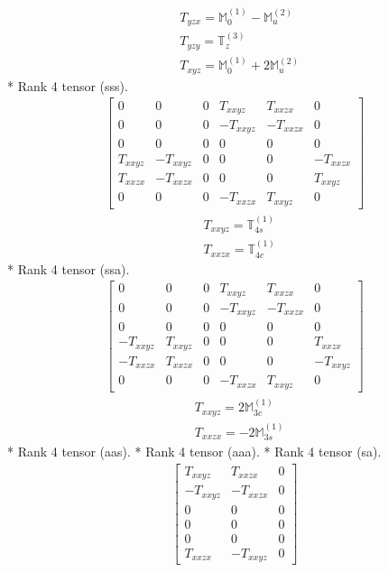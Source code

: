 \documentclass[fleqn,8pt,landscape]{jsarticle}
\begin{document}
\begin{align*}
& T_{yzx} = \mathbb{M}_{0}^{(1)} - \mathbb{M}_{u}^{(2)} \\
& T_{yzy} = \mathbb{T}_{z}^{(3)} \\
& T_{xyz} = \mathbb{M}_{0}^{(1)} + 2 \mathbb{M}_{u}^{(2)}
\end{align*}
* Rank 4 tensor (sss).
\begin{align*}
\begin{bmatrix} 0 & 0 & 0 & T_{xxyz} & T_{xxzx} & 0 \\ 0 & 0 & 0 & - T_{xxyz} & - T_{xxzx} & 0 \\ 0 & 0 & 0 & 0 & 0 & 0 \\ T_{xxyz} & - T_{xxyz} & 0 & 0 & 0 & - T_{xxzx} \\ T_{xxzx} & - T_{xxzx} & 0 & 0 & 0 & T_{xxyz} \\ 0 & 0 & 0 & - T_{xxzx} & T_{xxyz} & 0 \end{bmatrix}
\end{align*}
\begin{align*}
& T_{xxyz} = \mathbb{T}_{4s}^{(1)} \\
& T_{xxzx} = \mathbb{T}_{4c}^{(1)}
\end{align*}
* Rank 4 tensor (ssa).
\begin{align*}
\begin{bmatrix} 0 & 0 & 0 & T_{xxyz} & T_{xxzx} & 0 \\ 0 & 0 & 0 & - T_{xxyz} & - T_{xxzx} & 0 \\ 0 & 0 & 0 & 0 & 0 & 0 \\ - T_{xxyz} & T_{xxyz} & 0 & 0 & 0 & T_{xxzx} \\ - T_{xxzx} & T_{xxzx} & 0 & 0 & 0 & - T_{xxyz} \\ 0 & 0 & 0 & - T_{xxzx} & T_{xxyz} & 0 \end{bmatrix}
\end{align*}
\begin{align*}
& T_{xxyz} = 2 \mathbb{M}_{3c}^{(1)} \\
& T_{xxzx} = - 2 \mathbb{M}_{3s}^{(1)}
\end{align*}
* Rank 4 tensor (aas).
* Rank 4 tensor (aaa).
* Rank 4 tensor (sa).
\begin{align*}
\begin{bmatrix} T_{xxyz} & T_{xxzx} & 0 \\ - T_{xxyz} & - T_{xxzx} & 0 \\ 0 & 0 & 0 \\ 0 & 0 & 0 \\ 0 & 0 & 0 \\ T_{xxzx} & - T_{xxyz} & 0 \end{bmatrix}
\end{align*}
\end{document}
